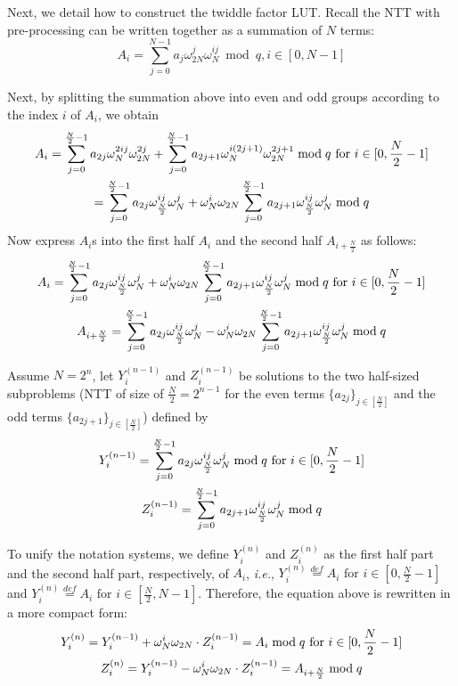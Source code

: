 \documentclass{iacrtrans}
\theoremstyle{plain}
\begin{document}
Next, we detail how to construct the twiddle factor LUT. Recall the NTT with pre-processing can be written together as a summation of $N$ terms:
\[
    A_i = \sum_{j=0}^{N-1}a_j\omega_{2N}^j\omega_N^{ij} \bmod q, i\in [0,N-1]
\]

Next, by splitting the summation above into even and odd groups according to the index $i$ of $A_i$, we obtain
\begin{gather}
    A_i = \sum_{j=0}^{\frac{N}{2}-1}a_{2j}\omega_N^{2ij}\omega_{2N}^{2j}  + \sum_{j=0}^{\frac{N}{2}-1}a_{2j+1}\omega_N^{i(2j+1)}\omega_{2N}^{2j+1} \bmod q \text{ for } i\in [0,\frac{N}{2}-1]\notag\\
    = \sum_{j=0}^{\frac{N}{2}-1}a_{2j}\omega_{\frac{N}{2}}^{ij}\omega_{N}^{j}  + \omega_{N}^i\omega_{2N}\sum_{j=0}^{\frac{N}{2}-1}a_{2j+1}\omega_{\frac{N}{2}}^{ij}\omega_N^{j} \bmod q \notag
\end{gather}
Now express $A_i$s into the first half $A_{i}$ and the second half $A_{i+\frac{N}{2}}$ as follows: 
\begin{gather}
    A_i = \sum_{j=0}^{\frac{N}{2}-1}a_{2j}\omega_{\frac{N}{2}}^{ij}\omega_{N}^{j}  + \omega_{N}^i\omega_{2N}\sum_{j=0}^{\frac{N}{2}-1}a_{2j+1}\omega_{\frac{N}{2}}^{ij}\omega_N^{j} \bmod q \text{ for } i\in [0,\frac{N}{2}-1]\notag\\
   A_{i+\frac{N}{2}} = \sum_{j=0}^{\frac{N}{2}-1}a_{2j}\omega_{\frac{N}{2}}^{ij}\omega_{N}^{j}  - \omega_{N}^i\omega_{2N}\sum_{j=0}^{\frac{N}{2}-1}a_{2j+1}\omega_{\frac{N}{2}}^{ij}\omega_N^{j} \bmod q \notag
\end{gather}

Assume $N=2^n$, let $Y_i^{(n-1)}$ and $Z_i^{(n-1)}$ be solutions to the two half-sized subproblems (NTT of size of $\frac{N}{2}=2^{n-1}$ for the even terms $\{a_{2j}\}_{j\in [\frac{N}{2}]}$ and the odd terms $\{a_{2j+1}\}_{j\in [\frac{N}{2}]}$) defined by
\begin{gather}
    Y_i^{(n-1)} = \sum_{j=0}^{\frac{N}{2}-1}a_{2j}\omega_{\frac{N}{2}}^{ij}\omega_{N}^{j} \bmod q \text{ for } i\in [0,\frac{N}{2}-1]\notag\\
    Z_i^{(n-1)} = \sum_{j=0}^{\frac{N}{2}-1}a_{2j+1}\omega_{\frac{N}{2}}^{ij}\omega_N^{j} \bmod q \notag
\end{gather}

To unify the notation systems, we define $Y_i^{(n)}$ and $Z_i^{(n)}$ as the first half part and the second half part, respectively, of $A_i$, \textit{i.e.}, $Y_i^{(n)}\overset{def}{=} A_i \text{ for } i\in [0,\frac{N}{2}-1]$ and $Y_i^{(n)}\overset{def}{=} A_i \text{ for } i\in [\frac{N}{2},N-1]$. Therefore, the equation above is rewritten in a more compact form:
\begin{gather}
    Y_i^{(n)} = Y_i^{(n-1)} + \omega_{N}^i\omega_{2N}\cdot Z_i^{(n-1)} = A_i\bmod q \text{ for } i\in [0,\frac{N}{2}-1]\notag\\
    Z_i^{(n)} = Y_i^{(n-1)} - \omega_{N}^i\omega_{2N}\cdot Z_i^{(n-1)} = A_{i+\frac{N}{2}} \bmod q \notag
\end{gather}
\end{document}

